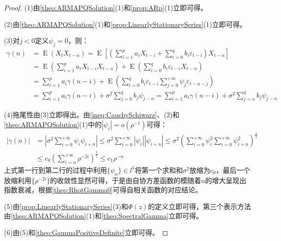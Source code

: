 \begin{proof}
	(1)由\cref{theo:ARMAPQSolution}(1)和\cref{prop:ARp}(1)立即可得。\par
	(2)由\cref{theo:ARMAPQSolution}(1)和\cref{prop:LinearlyStationarySeries}(1)立即可得。\par
	(3)对$j<0$定义$\psi_j=0$，则：
	\begin{align*}
		\gamma(n)&=\operatorname{E}(X_tX_{t-n})=\operatorname{E}\left[\left(\sum_{i=1}^{p}a_iX_{t-i}+\sum_{i=0}^{q}b_i\varepsilon_{t-i}\right)X_{t-n}\right] \\
		&=\operatorname{E}\left(\sum_{i=1}^{p}a_iX_{t-i}X_{t-n}\right)+\operatorname{E}\left(\sum_{i=0}^{q}b_i\varepsilon_{t-i}X_{t-n}\right) \\
		& =\sum_{i=1}^{p}a_i\gamma(n-i)+\operatorname{E}\left(\sum_{i=0}^{q}b_i\varepsilon_{t-i}\sum_{j=0}^{+\infty}\psi_j\varepsilon_{t-n-j}\right) \\
		&=\sum_{i=1}^{p}a_i\gamma(n-i)+\sigma^2\sum_{j=0}^{q}b_j\psi_{j-n}=\sum_{i=1}^{p}a_i\gamma(n-i)+\sigma^2\sum_{j=n}^{q}b_j\psi_{j-n}
	\end{align*}\par
	(4)拖尾性由(3)立即得出。由\cref{ineq:CauchySchiwarz}、(2)和\cref{theo:ARMAPQSolution}(1)中的$|\psi_i|=o(\rho^{-1})$可得：
	\begin{align*}
		|\gamma(n)|&=\left|\sigma^2\sum_{i=0}^{+\infty}\psi_i\psi_{i+n}\right|\leqslant\sigma^2\sum_{i=0}^{+\infty}|\psi_i||\psi_{i+n}|\leqslant\sigma^2\left(\sum_{i=0}^{+\infty}\psi_i^2\sum_{i=0}^{+\infty}\psi_{i+n}^2\right)^{\frac{1}{2}} \\
		&\leqslant c_0\left(\sum_{i=n}^{+\infty}\rho^{-2i}\right)^{\frac{1}{2}}\leqslant c_1\rho^{-n}
	\end{align*}
	上式第一行到第二行的过程中利用$\{\psi_n\}\in l^1$将第一个求和和$\sigma^2$放缩为$c_0$，最后一个放缩利用$\{\rho^{-2i}\}$的收敛性显然可得，于是由自协方差函数的模随着$n$的增大呈现出指数衰减，根据\cref{theo:RhotGamma0}可得自相关函数的对应结论。\par
	(5)由\cref{prop:LinearlyStationarySeries}(3)和$\Phi(z)$的定义立即可得，第三个表示方法由\cref{theo:ARMAPQSolution}(1)和\cref{theo:SpectralGamma}立即可得。\par
	(6)由(5)和\cref{theo:GammaPositiveDefinite}立即可得。
\end{proof}

